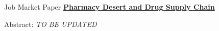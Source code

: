 \documentclass{resume} %
\begin{document}
	\begin{rSection}{Job Market Paper}
		\href{chanwoolkim.github.io}{\textbf{Pharmacy Desert and Drug Supply Chain}}
		
		Abstract: \textit{TO BE UPDATED}
	\end{rSection}

		
		
		
\end{document}
